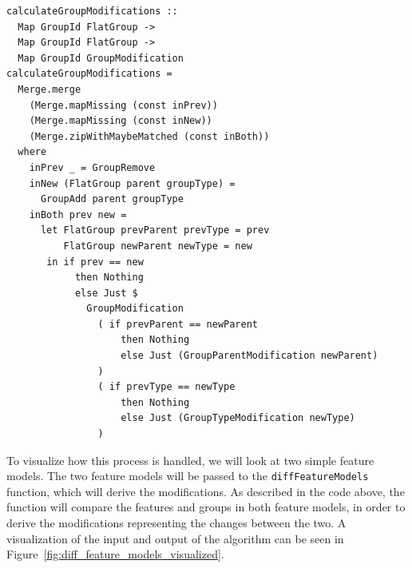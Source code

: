 \documentclass[a4paper,english]{ifimaster}
\begin{document}
\begin{verbatim}
calculateGroupModifications ::
  Map GroupId FlatGroup ->
  Map GroupId FlatGroup ->
  Map GroupId GroupModification
calculateGroupModifications =
  Merge.merge
    (Merge.mapMissing (const inPrev))
    (Merge.mapMissing (const inNew))
    (Merge.zipWithMaybeMatched (const inBoth))
  where
    inPrev _ = GroupRemove
    inNew (FlatGroup parent groupType) =
      GroupAdd parent groupType
    inBoth prev new =
      let FlatGroup prevParent prevType = prev
          FlatGroup newParent newType = new
       in if prev == new
            then Nothing
            else Just $
              GroupModification
                ( if prevParent == newParent
                    then Nothing
                    else Just (GroupParentModification newParent)
                )
                ( if prevType == newType
                    then Nothing
                    else Just (GroupTypeModification newType)
                )
\end{verbatim}

To visualize how this process is handled, we will look at two simple feature models. The two feature models will be passed to the \texttt{diffFeatureModels} function, which will derive the modifications. As described in the code above, the function will compare the features and groups in both feature models, in order to derive the modifications representing the changes between the two. A visualization of the input and output of the algorithm can be seen in Figure~\ref{fig:diff_feature_models_visualized}.
\end{document}
